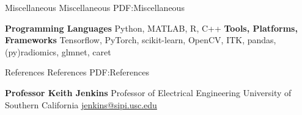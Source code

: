 \documentclass[letterpaper,MMMyyyy,nonstopmode]{simpleresumecv}
\begin{document}
\begin{Body}







\Section
{Miscellaneous}
{Miscellaneous}
{PDF:Miscellaneous}

\Entry
\textbf{Programming Languages}
\BulletItem
Python,
MATLAB,
R,
C++
\BigGap
\textbf{Tools, Platforms, Frameworks}
\BulletItem
Tensorflow,
PyTorch,
scikit-learn,
OpenCV,
ITK,
pandas,
(py)radiomics,
glmnet,
caret





\Section
{References}
{References}
{PDF:References}

\BulletItem
\textbf{Professor Keith Jenkins}
\newline
Professor of Electrical Engineering
\newline
University of Southern California
\newline
\href{mailto:jenkins@sipi.usc.edu}
{jenkins@sipi.usc.edu}


\end{Body}
\end{document}
